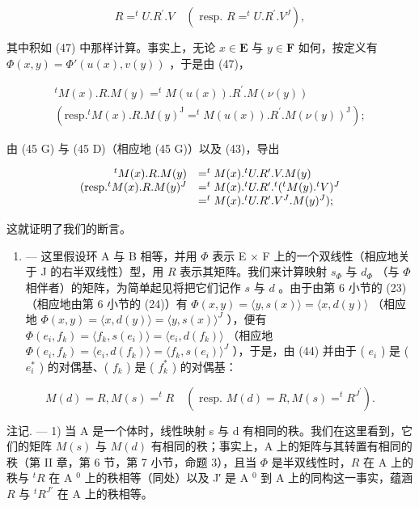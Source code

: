 \[
R = ^ {t} U. R ^ {\prime}. V \quad (\text { resp. } R = ^ {t} U. R ^ {\prime}. V ^ {J}),\tag{48}
\]

其中积如 (47) 中那样计算。事实上，无论 \(x \in \mathbf{E}\) 与 \(y \in \mathbf{F}\) 如何，按定义有 \(\Phi(x, y) = \Phi'(u(x), v(y))\) ，于是由 (47)，

\[
\begin{array}{c} ^ {t} M (x). R. M (y) = ^ {t} M (u (x)). R ^ {\prime}. M (\nu (y)) \\ (\text {resp.} ^ {t} M (x). R. M (y) ^ {\mathrm{J}} = ^ {t} M (u (x)). R ^ {\prime}. M (\nu (y)) ^ {\mathrm{J}}); \end{array}
\]

由 (45 G) 与 (45 D)（相应地 (45 G)）以及 (43)，导出

\[
\begin{array}{r l} ^ {t} M (x). R. M (y) & = ^ {t} M (x). ^ {t} U. R ^ {\prime}. V. M (y) \\ (\text {resp.} ^ {t} M (x). R. M (y) ^ {J} & = ^ {t} M (x). ^ {t} U. R ^ {\prime}. ^ {t} (^ {t} M (y). ^ {t} V) ^ {J} \\ & = ^ {t} M (x). ^ {t} U. R ^ {\prime}. V ^ {J}. M (y) ^ {J}); \end{array}
\]

这就证明了我们的断言。

\begin{enumerate}
\def\labelenumi{\Roman{enumi}.}
\setcounter{enumi}{3}
\tightlist
\item
  --- 这里假设环 A 与 B 相等，并用 \(\Phi\) 表示 E × F 上的一个双线性（相应地关于 J 的右半双线性）型，用 \(R\) 表示其矩阵。我们来计算映射 \(s_{\Phi}\) 与 \(d_{\Phi}\) （与 \(\Phi\) 相伴者）的矩阵，为简单起见将把它们记作 \(s\) 与 \(d\) 。由于由第 6 小节的 (23)（相应地由第 6 小节的 (24)）有 \(\Phi(x, y) = \langle y, s(x) \rangle = \langle x, d(y) \rangle\) （相应地 \(\Phi(x, y) = \langle x, d(y) \rangle = \langle y, s(x) \rangle^{J}\) ），便有 \(\Phi(e_i, f_k) = \langle f_k, s(e_i) \rangle = \langle e_i, d(f_k) \rangle\) （相应地 \(\Phi(e_i, f_k) = \langle e_i, d(f_k) \rangle = \langle f_k, s(e_i) \rangle^{J}\) ），于是，由 (44) 并由于 ( \(e_i\) ) 是 ( \(e_i^*\) ) 的对偶基、( \(f_k\) ) 是 ( \(f_k^*\) ) 的对偶基：
\end{enumerate}

\[
M (d) = R,   M (s) = ^ {t} R \quad (\text { resp. }   M (d) = R,   M (s) = ^ {t} R ^ {J ^ {\prime}}).\tag{49}
\]

注记. --- 1) 当 A 是一个体时，线性映射 s 与 d 有相同的秩。我们在这里看到，它们的矩阵 \(M(s)\) 与 \(M(d)\) 有相同的秩；事实上，A 上的矩阵与其转置有相同的秩（第 II 章，第 6 节，第 7 小节，命题 3），且当 \(\Phi\) 是半双线性时，\(R\) 在 A 上的秩与 \(^tR\) 在 A \(^0\) 上的秩相等（同处）以及 J′ 是 A \(^0\) 到 A 上的同构这一事实，蕴涵 \(R\) 与 \(^tR^{J'}\) 在 A 上的秩相等。

